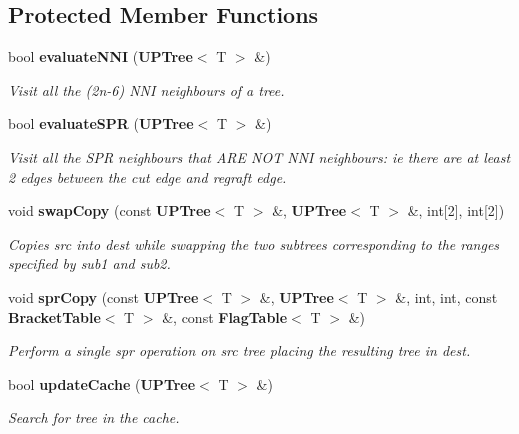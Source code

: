 \subsection*{Protected Member Functions}
\begin{CompactItemize}
\item 
bool {\bf evaluate\-NNI} ({\bf UPTree}$<$ T $>$ \&)
\begin{CompactList}\small\item\em Visit all the (2n-6) NNI neighbours of a tree. \item\end{CompactList}\item 
bool {\bf evaluate\-SPR} ({\bf UPTree}$<$ T $>$ \&)
\begin{CompactList}\small\item\em Visit all the SPR neighbours that ARE NOT NNI neighbours: ie there are at least 2 edges between the cut edge and regraft edge. \item\end{CompactList}\item 
void {\bf swap\-Copy} (const {\bf UPTree}$<$ T $>$ \&, {\bf UPTree}$<$ T $>$ \&, int[2], int[2])
\begin{CompactList}\small\item\em Copies src into dest while swapping the two subtrees corresponding to the ranges specified by sub1 and sub2. \item\end{CompactList}\item 
void {\bf spr\-Copy} (const {\bf UPTree}$<$ T $>$ \&, {\bf UPTree}$<$ T $>$ \&, int, int, const {\bf Bracket\-Table}$<$ T $>$ \&, const {\bf Flag\-Table}$<$ T $>$ \&)
\begin{CompactList}\small\item\em Perform a single spr operation on src tree placing the resulting tree in dest. \item\end{CompactList}\item 
bool {\bf update\-Cache} ({\bf UPTree}$<$ T $>$ \&)
\begin{CompactList}\small\item\em Search for tree in the cache. \item\end{CompactList}\end{CompactItemize}
